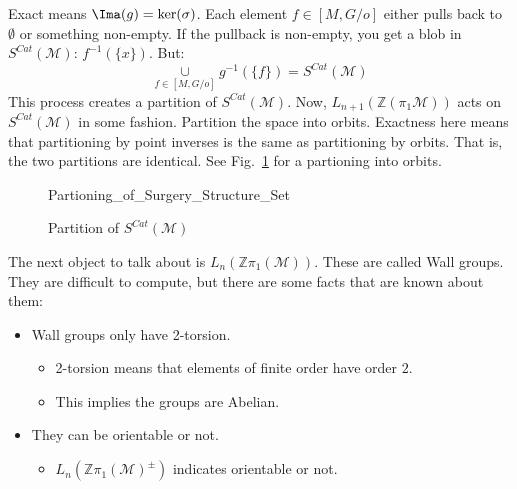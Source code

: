 \documentclass[crop=false,class=article,oneside]{standalone}
\begin{document}
            Exact means $\Ima(g)=\ker(\sigma)$.
            Each element $f\in{[M,G/o]}$
            either pulls back to $\emptyset$ or
            something non-empty. If the pullback is non-empty,
            you get a blob in
            $S^{Cat}(\mathcal{M})$: $f^{-1}(\{x\})$.
            But:
            \begin{equation*}
                \underset{f\in[M,G/o]}{\cup}g^{-1}(\{f\})
                =S^{Cat}(\mathcal{M})
            \end{equation*}
            This process creates a partition of
            $S^{Cat}(\mathcal{M})$. Now,
            $L_{n+1}(\mathbb{Z}(\pi_{1}\mathcal{M}))$
            acts on $S^{Cat}(\mathcal{M})$ in some fashion.
            Partition the space into orbits. Exactness
            here means that partitioning by point inverses
            is the same as partitioning by orbits. That is,
            the two partitions are identical. See
            Fig.~\ref{fig:surgery_theory_partition_of_S_Cat}
            for a partioning into orbits.
            \begin{figure}[H]
                \centering
                \captionsetup{type=figure}
                
                          {Partioning_of_Surgery_Structure_Set}
                \caption[%
                    Surgery Theory - Partion of $S^{Cat}$%
                ]{%
                    Partition of $S^{Cat}(\mathcal{M})$%
                }
                \label{fig:surgery_theory_partition_of_S_Cat}
            \end{figure}
            The next object to talk about is
            $L_{n}(\mathbb{Z}\pi_{1}(\mathcal{M}))$.
            These are called Wall groups.
            They are difficult to compute,
            but there are some facts that are known about them:
            \begin{itemize}
                \item Wall groups only have 2-torsion.
                \begin{itemize}
                    \item 2-torsion means that elements
                          of finite order have order $2$.
                    \item This implies the groups are Abelian.
                \end{itemize}
                \item They can be orientable or not.
                \begin{itemize}
                    \item $L_{n}(%
                           \mathbb{Z}\pi_{1}(\mathcal{M})^{\pm})$
                           indicates orientable or not.
                \end{itemize}
            \end{itemize}
\end{document}
